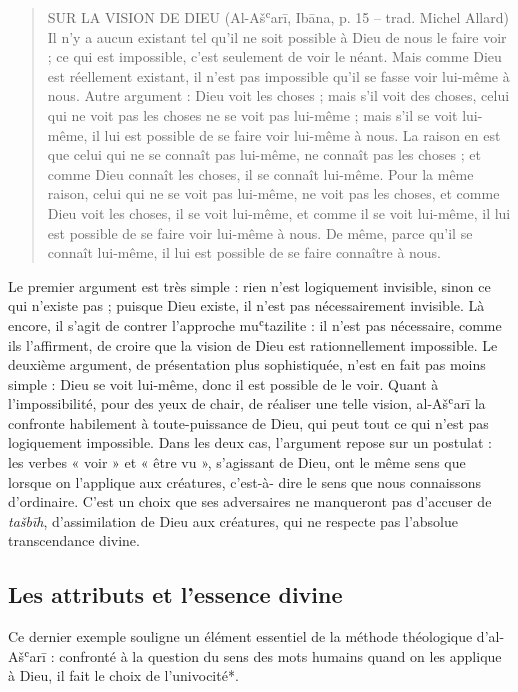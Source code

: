 \begin{quote}
    SUR LA VISION DE DIEU (Al-Ašʿarī, Ibāna, p. 15 – trad. Michel Allard)
Il n’y a aucun existant tel qu’il ne soit possible à Dieu de nous le faire voir ; ce qui est impossible, c’est seulement de voir le néant. Mais comme Dieu est réellement existant, il n’est pas impossible qu’il se fasse voir lui-même à nous.
Autre argument : Dieu voit les choses ; mais s’il voit des choses, celui qui ne voit pas les choses ne se voit pas lui-même ; mais s’il se voit lui-même, il lui est possible de se faire voir lui-même à nous. La raison en est que celui qui ne se connaît pas lui-même, ne connaît pas les choses ; et comme Dieu connaît les choses, il se connaît lui-même. Pour la même raison, celui qui ne se voit pas lui-même, ne voit pas les choses, et comme Dieu voit les choses, il se voit lui-même, et comme il se voit lui-même, il lui est possible de se faire voir lui-même à nous. De même, parce qu’il se connaît lui-même, il lui est possible de se faire connaître à nous.

\end{quote}

Le premier argument est très simple : rien n'est logiquement invisible,
sinon ce qui n'existe pas ; puisque Dieu existe, il n'est pas
nécessairement invisible. Là encore, il s'agit de contrer l'approche
muʿtazilite : il n'est pas nécessaire, comme ils l'affirment, de croire
que la vision de Dieu est rationnellement impossible. Le deuxième
argument, de présentation plus sophistiquée, n'est en fait pas moins
simple : Dieu se voit lui-même, donc il est possible de le voir. Quant à
l'impossibilité, pour des yeux de chair, de réaliser une telle vision,
al-Ašʿarī la confronte habilement à toute-puissance de Dieu, qui peut
tout ce qui n'est pas logiquement impossible. Dans les deux cas,
l'argument repose sur un postulat : les verbes « voir » et « être vu »,
s'agissant de Dieu, ont le même sens que lorsque on l'applique aux
créatures, c'est-à- dire le sens que nous connaissons d'ordinaire. C'est
un choix que ses adversaires ne manqueront pas d'accuser de
\emph{tašbīh}, d'assimilation de Dieu aux créatures, qui ne respecte pas
l'absolue transcendance divine.


  \subsection{Les attributs et l'essence divine}
  


Ce dernier exemple souligne un élément essentiel de la méthode
théologique d'al-Ašʿarī : confronté à la question du sens des mots
humains quand on les applique à Dieu, il fait le choix de l'univocité*.

